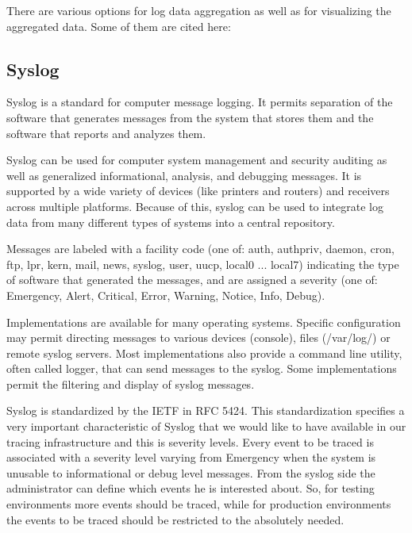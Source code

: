 There are various options for log data aggregation as well as for visualizing
the aggregated data. Some of them are cited here:

\subsection{Syslog}

Syslog is a standard for computer message logging. It permits separation of the
software that generates messages from the system that stores them and the
software that reports and analyzes them.

Syslog can be used for computer system management and security auditing as well
as generalized informational, analysis, and debugging messages. It is supported
by a wide variety of devices (like printers and routers) and receivers across
multiple platforms. Because of this, syslog can be used to integrate log data
from many different types of systems into a central repository.

Messages are labeled with a facility code (one of: auth, authpriv, daemon, cron,
ftp, lpr, kern, mail, news, syslog, user, uucp, local0 ... local7) indicating
the type of software that generated the messages, and are assigned a severity
(one of: Emergency, Alert, Critical, Error, Warning, Notice, Info, Debug).

Implementations are available for many operating systems. Specific configuration
may permit directing messages to various devices (console), files (/var/log/) or
remote syslog servers. Most implementations also provide a command line utility,
often called logger, that can send messages to the syslog. Some implementations
permit the filtering and display of syslog messages.

Syslog is standardized by the IETF in RFC 5424. This standardization specifies a
very important characteristic of Syslog that we would like to have available in
our tracing infrastructure and this is severity levels. Every event to be traced
is associated with a severity level varying from Emergency when the system is
unusable to informational or debug level messages. From the syslog side the
administrator can define which events he is interested about. So, for testing
environments more events should be traced, while for production environments the
events to be traced should be restricted to the absolutely needed. 


